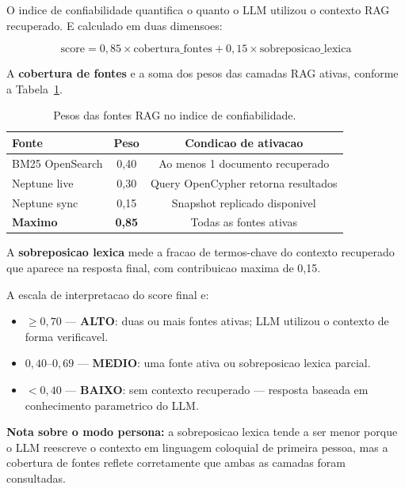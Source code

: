 O indice de confiabilidade
quantifica o quanto o LLM utilizou o contexto RAG recuperado.
E calculado em duas dimensoes:

\begin{equation}
  \text{score} = 0{,}85 \times \text{cobertura\_fontes}
               + 0{,}15 \times \text{sobreposicao\_lexica}
  \label{eq:indice_confiabilidade}
\end{equation}

A \textbf{cobertura de fontes} e a soma dos pesos das camadas RAG ativas,
conforme a Tabela~\ref{tab:pesos_rag}.

\begin{table}[ht]
\centering
\caption{Pesos das fontes RAG no indice de confiabilidade.}
\label{tab:pesos_rag}
\begin{tabular}{lcc}
\toprule
\textbf{Fonte} & \textbf{Peso} & \textbf{Condicao de ativacao} \\
\midrule
BM25 OpenSearch  & 0,40 & Ao menos 1 documento recuperado \\
Neptune live     & 0,30 & Query OpenCypher retorna resultados \\
Neptune sync     & 0,15 & Snapshot replicado disponivel \\
\midrule
\textbf{Maximo}  & \textbf{0,85} & Todas as fontes ativas \\
\bottomrule
\end{tabular}
\end{table}

A \textbf{sobreposicao lexica} mede a fracao de termos-chave do contexto
recuperado que aparece na resposta final, com contribuicao maxima de 0,15.

A escala de interpretacao do score final e:

\begin{itemize}[leftmargin=*]
  \item $\geq 0{,}70$ --- \textbf{ALTO}: duas ou mais fontes ativas;
        LLM utilizou o contexto de forma verificavel.
  \item $0{,}40$--$0{,}69$ --- \textbf{MEDIO}: uma fonte ativa ou
        sobreposicao lexica parcial.
  \item $< 0{,}40$ --- \textbf{BAIXO}: sem contexto recuperado ---
        resposta baseada em conhecimento parametrico do LLM.
\end{itemize}

\textbf{Nota sobre o modo persona:} a sobreposicao lexica tende a ser
menor porque o LLM reescreve o contexto em linguagem coloquial de
primeira pessoa, mas a cobertura de fontes reflete corretamente que
ambas as camadas foram consultadas.

